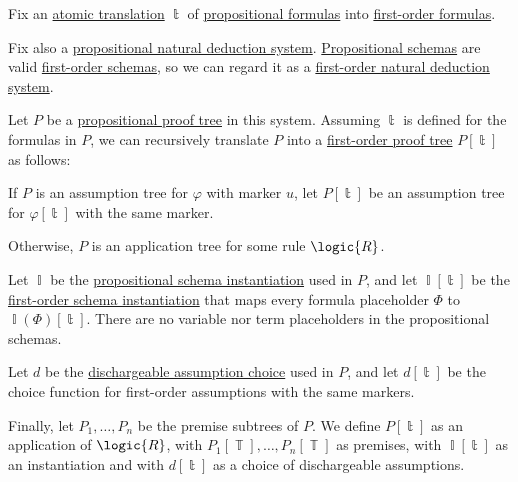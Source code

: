 \begin{algorithm}\label{alg:fol_propositional_proof_tree_translation}
  Fix an \hyperref[def:atomic_fol_propositional_formula_translation]{atomic translation} \( \Bbbt \) of \hyperref[def:propositional_formula]{propositional formulas} into \hyperref[def:fol_formula]{first-order formulas}.

  Fix also a \hyperref[def:propositional_natural_deduction_system]{propositional natural deduction system}. \hyperref[def:propositional_formula_schema]{Propositional schemas} are valid \hyperref[def:fol_formula_schema]{first-order schemas}, so we can regard it as a \hyperref[def:fol_natural_deduction_system]{first-order natural deduction system}.

  Let \( P \) be a \hyperref[def:propositional_natural_deduction_proof_tree]{propositional proof tree} in this system. Assuming \( \Bbbt \) is defined for the formulas in \( P \), we can recursively translate \( P \) into a \hyperref[def:fol_natural_deduction_proof_tree]{first-order proof tree} \( P[\Bbbt] \) as follows:
  \begin{thmenum}
     If \( P \) is an assumption tree for \( \varphi \) with marker \( u \), let \( P[\Bbbt] \) be an assumption tree for \( \varphi[\Bbbt] \) with the same marker.

     Otherwise, \( P \) is an application tree for some rule \( \logic{R} \).

    Let \( \BbbI \) be the \hyperref[def:atomic_propositional_instantiation]{propositional schema instantiation} used in \( P \), and let \( \BbbI[\Bbbt] \) be the \hyperref[def:atomic_fol_instantiation]{first-order schema instantiation} that maps every formula placeholder \( \Phi \) to \( \BbbI(\Phi)[\Bbbt] \). There are no variable nor term placeholders in the propositional schemas.

    Let \( d \) be the \hyperref[def:propositional_natural_deduction_proof_tree/application/dischargeable]{dischargeable assumption choice} used in \( P \), and let \( d[\Bbbt] \) be the choice function for first-order assumptions with the same markers.

    Finally, let \( P_1, \ldots, P_n \) be the premise subtrees of \( P \). We define \( P[\Bbbt] \) as an application of \( \logic{R} \), with \( P_1[\BbbT], \ldots, P_n[\BbbT] \) as premises, with \( \BbbI[\Bbbt] \) as an instantiation and with \( d[\Bbbt] \) as a choice of dischargeable assumptions.
  \end{thmenum}
\end{algorithm}
